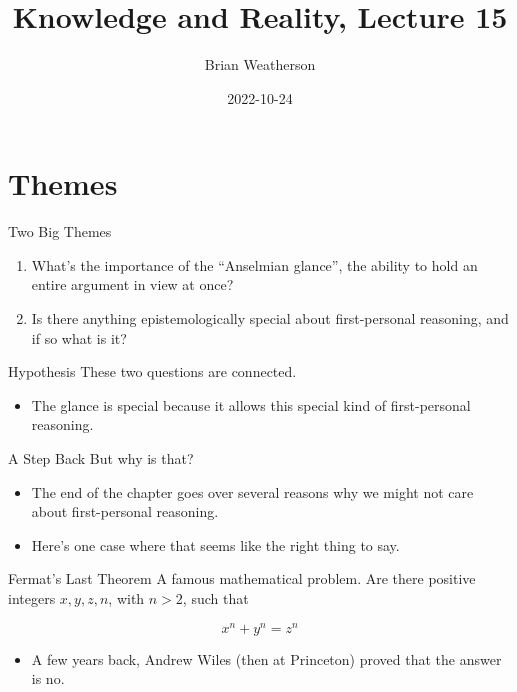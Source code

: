 \documentclass[
  17pt,
  letterpaper,
  ignorenonframetext,
  aspectratio=169,
  handout]{beamer}
\title{Knowledge and Reality, Lecture 15}
\author{Brian Weatherson}
\date{2022-10-24}
\providecommand{\tightlist}{%
  \setlength{\itemsep}{0pt}\setlength{\parskip}{0pt}}\usepackage{longtable,booktabs,array}
\begin{document}
\frame{\titlepage}
\ifdefined\Shaded\renewenvironment{Shaded}{\begin{tcolorbox}[frame hidden, sharp corners, interior hidden, borderline west={3pt}{0pt}{shadecolor}, boxrule=0pt, enhanced, breakable]}{\end{tcolorbox}}\fi

\hypertarget{themes}{%
\section{Themes}\label{themes}}

\begin{frame}{Two Big Themes}
\protect\hypertarget{two-big-themes}{}
\begin{enumerate}[<+->]
\tightlist
\item
  What's the importance of the ``Anselmian glance'', the ability to hold
  an entire argument in view at once?
\item
  Is there anything epistemologically special about first-personal
  reasoning, and if so what is it?
\end{enumerate}
\end{frame}

\begin{frame}{Hypothesis}
\protect\hypertarget{hypothesis}{}
These two questions are connected.

\begin{itemize}[<+->]
\tightlist
\item
  The glance is special because it allows this special kind of
  first-personal reasoning.
\end{itemize}
\end{frame}

\begin{frame}{A Step Back}
\protect\hypertarget{a-step-back}{}
But why is that?

\begin{itemize}[<+->]
\tightlist
\item
  The end of the chapter goes over several reasons why we might not care
  about first-personal reasoning.
\item
  Here's one case where that seems like the right thing to say.
\end{itemize}
\end{frame}

\begin{frame}{Fermat's Last Theorem}
\protect\hypertarget{fermats-last-theorem}{}
A famous mathematical problem. Are there positive integers
\(x, y, z, n\), with \(n > 2\), such that

\[
x^n + y^n = z^n
\]

\begin{itemize}[<+->]
\tightlist
\item
  A few years back, Andrew Wiles (then at Princeton) proved that the
  answer is no.
\end{itemize}
\end{frame}
\end{document}
